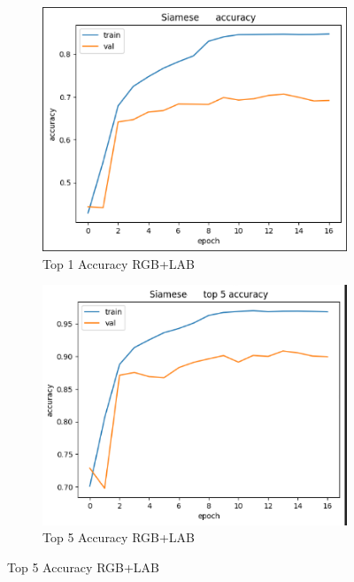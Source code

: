 \begin{figure}[htbp]
  \centering

  \begin{subfigure}[b]{0.45\textwidth}
    \includegraphics[width=\textwidth]{graphics/images/results/v2-accu1.png}
    \caption{Top 1 Accuracy RGB+LAB}
    \label{fig:v2-accu1}
  \end{subfigure}
  \hfill
  \begin{subfigure}[b]{0.45\textwidth}
    \includegraphics[width=\textwidth]{graphics/images/results/v2-accu5.png}
    \caption{Top 5 Accuracy RGB+LAB}
    \label{fig:v2-accu5}
  \end{subfigure}

\end{figure}
